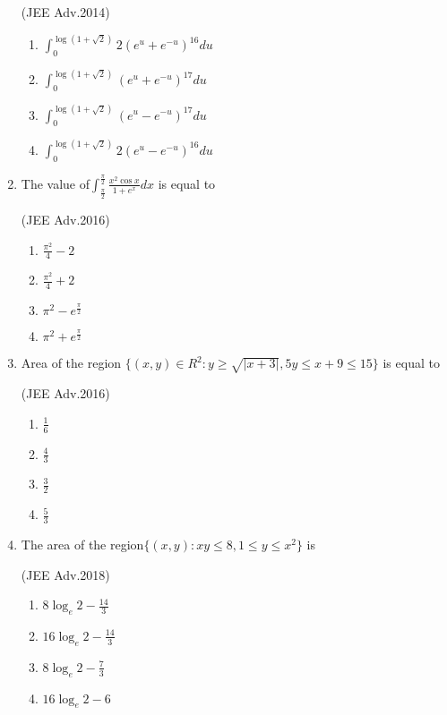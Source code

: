 \documentclass[journal,12pt,twocolumn]{IEEEtran}
\theoremstyle{remark}
\begin{document}
\begin{enumerate}
		\hfill{(JEE Adv.2014)}
		\begin{enumerate}
			\item $\int_{0}^{\log(1+\sqrt{2})}2(e^u+e^{-u})^{16} du$
			\item $\int_{0}^{\log(1+\sqrt{2})}(e^u+e^{-u})^{17} du$
			\item $\int_{0}^{\log(1+\sqrt{2})}(e^u-e^{-u})^{17} du$
			\item $\int_{0}^{\log(1+\sqrt{2})}2(e^u-e^{-u})^{16} du$
		\end{enumerate}
	\item 
		The value of$\int_{\frac{\pi}{2}}^{\frac{\pi}{2}}\frac{x^2\cos x}{1+e^x} dx$ is equal to

		\hfill{(JEE Adv.2016)}
		\begin{multicols}{2}
		\begin{enumerate}
			\item $\frac{\pi^2}{4}-2$
			\item $\frac{\pi^2}{4}+2$
                        \item $\pi^2-e^{\frac{\pi}{2}}$
			\item $\pi^2+e^{\frac{\pi}{2}}$
		\end{enumerate}
		\end{multicols}
	\item
		Area of the region $\{(x,y)\in R^2:y\geq\sqrt{|x+3|},5y\leq x+9\leq15\}$ is equal to

		\hfill{(JEE Adv.2016)}
		\begin{multicols}{4}
		\begin{enumerate}
			\item $\frac{1}{6}$
			\item $\frac{4}{3}$
			\item $\frac{3}{2}$
			\item $\frac{5}{3}$
		\end{enumerate}
		\end{multicols}
	\item
		The area of the region$\{(x,y):xy\leq8,1\leq{y}\leq{x^2}\}$ is

		\hfill{(JEE Adv.2018)}
		\begin{multicols}{2}
		\begin{enumerate}
			\item $8\log_e2-\frac{14}{3}$
			\item $16\log_e2-\frac{14}{3}$
			\item $8\log_e2-\frac{7}{3}$
			\item $16\log_e2-6$
		\end{enumerate}
		\end{multicols}

\end{enumerate}
\end{document}
